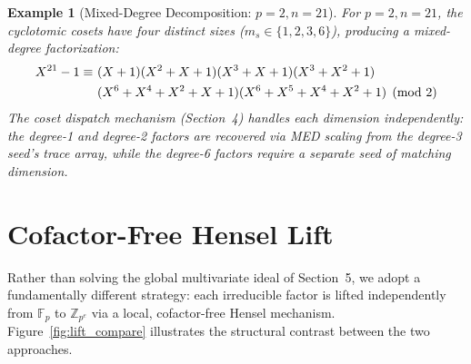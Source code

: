 \documentclass[12pt]{article}
\theoremstyle{plain}
\newtheorem{example}{Example}
\begin{document}
\begin{example}[Mixed-Degree Decomposition: $p=2, n=21$]
For $p=2, n=21$, the cyclotomic cosets have four distinct sizes ($m_s \in \{1, 2, 3, 6\}$), producing a mixed-degree factorization:
\begin{align}
    X^{21}-1 \equiv \ &(X+1)(X^2+X+1)(X^3+X+1)(X^3+X^2+1) \notag \\
                      &(X^6+X^4+X^2+X+1)(X^6+X^5+X^4+X^2+1) \pmod 2
\end{align}
The coset dispatch mechanism (Section~4) handles each dimension independently: the degree-1 and degree-2 factors are recovered via MED scaling from the degree-3 seed's trace array, while the degree-6 factors require a separate seed of matching dimension.
\end{example}


\section{Cofactor-Free Hensel Lift} \label{sec:local_lift}

Rather than solving the global multivariate ideal of Section~5, we adopt a fundamentally different strategy: each irreducible factor is lifted independently from $\mathbb{F}_p$ to $\mathbb{Z}_{p^e}$ via a local, cofactor-free Hensel mechanism. Figure~\ref{fig:lift_compare} illustrates the structural contrast between the two approaches.
\end{document}
